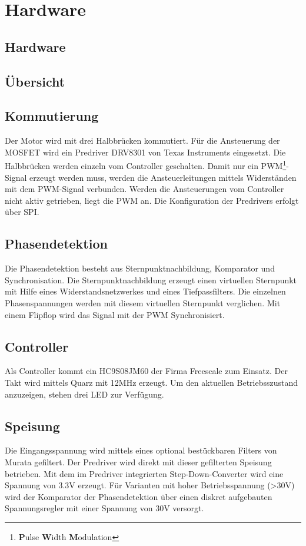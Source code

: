 \ifSTANDALONE
\section{Hardware}
\fi
\ifEMBED
\subsection{Hardware}
\fi

\subsection{Übersicht}


\subsection{Kommutierung}
Der Motor wird mit drei Halbbrücken kommutiert. Für die Ansteuerung der MOSFET 
wird ein Predriver DRV8301 von Texas Instruments eingesetzt. Die Halbbrücken 
werden einzeln vom Controller geschalten. Damit nur ein 
PWM\footnote{\textbf{P}ulse \textbf{W}idth \textbf{M}odulation}-Signal erzeugt 
werden muss, werden die Ansteuerleitungen mittels Widerständen mit dem 
PWM-Signal verbunden. Werden die Ansteuerungen vom Controller nicht aktiv 
getrieben, liegt die PWM an. Die Konfiguration der Predrivers erfolgt über SPI. 

\subsection{Phasendetektion}
Die Phasendetektion besteht aus Sternpunktnachbildung, Komparator und 
Synchronisation. Die Sternpunktnachbildung erzeugt einen virtuellen Sternpunkt 
mit Hilfe eines Widerstandsnetzwerkes und eines Tiefpassfilters. Die einzelnen 
Phasenspannungen werden mit diesem virtuellen Sternpunkt verglichen. Mit einem 
Flipflop wird das Signal mit der PWM Synchronisiert. 

\subsection{Controller}
Als Controller kommt ein HC9S08JM60 der Firma Freescale zum Einsatz. Der Takt 
wird mittels Quarz mit 12MHz erzeugt. Um den aktuellen Betriebsszustand 
anzuzeigen, stehen drei LED zur Verfügung. 

\subsection{Speisung}
Die Eingangsspannung wird mittels eines optional bestückbaren Filters von 
Murata gefiltert. Der Predriver wird direkt mit dieser gefilterten Speisung 
betrieben. Mit dem im Predriver integrierten Step-Down-Converter wird eine 
Spannung von 3.3V erzeugt. Für Varianten mit hoher Betriebsspannung (>30V) 
wird der Komparator der Phasendetektion über einen diskret aufgebauten 
Spannungsregler mit einer Spannung von 30V versorgt. 


